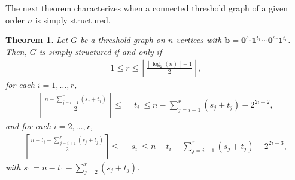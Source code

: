\documentclass[preprint]{elsarticle}
\newtheorem{teorema}[theorem]{Theorem}
\begin{document}

The next theorem characterizes when a connected threshold graph of a given order $n$ is simply structured.

\begin{teorema}\label{teorema ss}
Let $G$ be a threshold graph on $n$ vertices with $\mathbf{b}=\mathbf{0}^{s_1}\mathbf{1}^{t_1}\cdots \mathbf{0}^{s_r}\mathbf{1}^{t_r}$. Then, $G$ is simply structured if and only if  
\begin{align}
    1\leq r \leq \left\lfloor \frac{\left\lfloor \log_2(n)  \right\rfloor + 1}{2} \right\rfloor,
\end{align}
for each $i=1, \ldots, r$,
    \begin{align}\label{s1-ss}
        \left\lceil \frac{n-\sum_{j=i+1}^r(s_j+t_j)}{2} \right\rceil \leq & \ \ t_i \ \leq n-\sum_{j=i+1}^r(s_j+t_j) -2^{2i-2}, 
    \end{align}
and for each $i=2, \ldots, r$,
\begin{align}\label{s1-ss-2}
        \left\lceil \frac{n-t_i-\sum_{j=i+1}^r(s_j+t_j)}{2} \right\rceil \leq & \ \ s_i \ \leq n-t_i-\sum_{j=i+1}^r(s_j+t_j) -2^{2i-3}, 
    \end{align}
with $s_1 = n-t_1-\sum_{j=2}^r(s_j+t_j)$.
\end{teorema}
\end{document}
